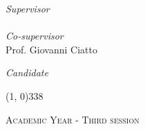 \begin{titlepage}
\begin{center}
\vspace{20pt}

\begin{large}
\begin{flushleft}
\textit{Supervisor}\\
\vspace{5pt} 
\profTitle \myProf\\
\textit{Co-supervisor}\\
\vspace{5pt}
Prof. Giovanni Ciatto
\end{flushleft}

\vspace{0pt} 

\begin{flushright}
\textit{Candidate}\\
\vspace{5pt} 
\myName
\end{flushright}
\end{large}

\vspace{20pt}

\line(1, 0){338} \\
\begin{normalsize}
\textsc{Academic Year \myAA - Third session}
\end{normalsize}

\end{center}
\end{titlepage}